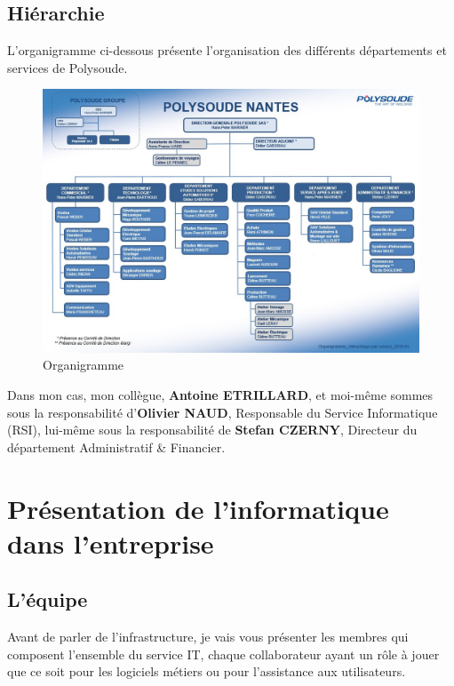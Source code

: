 \documentclass[11pt,a4paper,oneside]{article}
\begin{document}
\subsection{Hiérarchie}
L’organigramme ci-dessous présente l’organisation des différents départements et services de Polysoude.
\begin{figure}[h!]
  \centering
  \includegraphics[width=\linewidth]{Ressources/Organigramme.jpg}
  \caption{Organigramme}
\end{figure}

Dans mon cas, mon collègue, \textbf{Antoine ETRILLARD}, et moi-même sommes sous la responsabilité d'\textbf{Olivier NAUD}, Responsable du Service Informatique (RSI), lui-même sous la responsabilité de  \textbf{Stefan CZERNY}, Directeur du département Administratif \& Financier.
\newpage

\section{Présentation de l'informatique dans l'entreprise}
\subsection{L'équipe}
Avant de parler de l’infrastructure, je vais vous présenter les membres qui composent l’ensemble du service IT, chaque collaborateur ayant un rôle à jouer que ce soit pour les logiciels métiers ou pour l’assistance aux utilisateurs.
\end{document}
